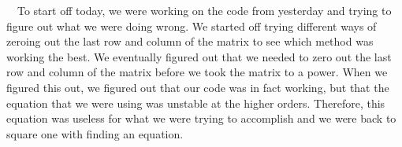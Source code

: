 

$\quad$To start off today, we were working on the code from yesterday and trying to figure out what we were doing wrong. We started off trying different ways of zeroing out the last row and column of the matrix to see which method was working the best. We eventually figured out that we needed to zero out the last row and column of the matrix before we took the matrix to a power. When we figured this out, we figured out that our code was in fact working, but that the equation that we were using was unstable at the higher orders. Therefore, this equation was useless for what we were trying to accomplish and we were back to square one with finding an equation.